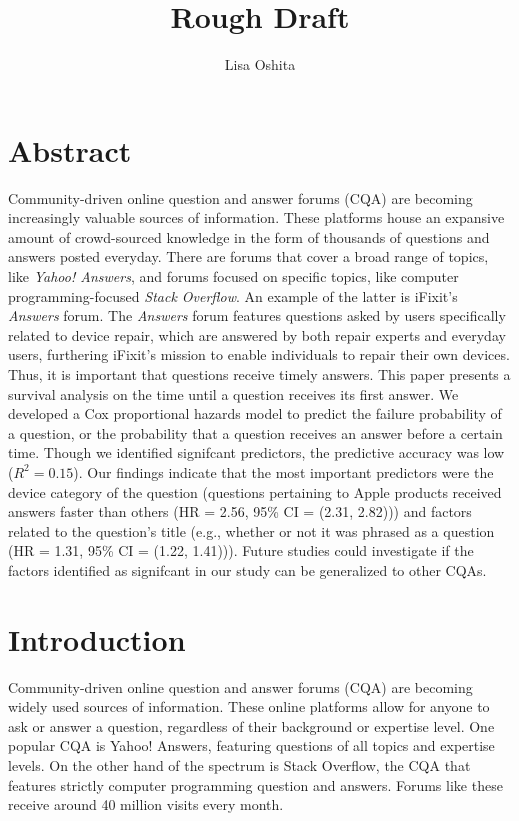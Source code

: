 \documentclass[12pt]{article}
\title{Rough Draft}
\author{Lisa Oshita}
\date{}
\begin{document}
\maketitle

\section{Abstract}

Community-driven online question and answer forums (CQA) are becoming increasingly valuable sources of information. These platforms house an expansive amount of crowd-sourced knowledge in the form of thousands of questions and answers posted everyday. There are forums that cover a broad range of topics, like \textit{Yahoo! Answers}, and forums focused on specific topics, like computer programming-focused \textit{Stack Overflow}. An example of the latter is iFixit's \textit{Answers} forum. The \textit{Answers} forum features questions asked by users specifically related to device repair, which are answered by both repair experts and everyday users, furthering iFixit's mission to enable individuals to repair their own devices. Thus, it is important that questions receive timely answers. This paper presents a survival analysis on the time until a question receives its first answer. We developed a Cox proportional hazards model to predict the failure probability of a question, or the probability that a question receives an answer before a certain time. Though we identified signifcant predictors, the predictive accuracy was low ($R^2 = 0.15$). Our findings indicate that the most important predictors were the device category of the question (questions pertaining to Apple products received answers faster than others (HR = 2.56, 95\% CI = (2.31, 2.82))) and factors related to the question's title (e.g., whether or not it was phrased as a question (HR = 1.31, 95\% CI = (1.22, 1.41))). Future studies could investigate if the factors identified as signifcant in our study can be generalized to other CQAs. 

\section{Introduction}

    Community-driven online question and answer forums (CQA) are becoming widely used sources of information. These online platforms allow for anyone to ask or answer a question, regardless of their background or expertise level. One popular CQA is Yahoo! Answers, featuring questions of all topics and expertise levels. On the other hand of the spectrum is Stack Overflow, the CQA that features strictly computer programming question and answers. Forums like these receive around 40 million visits every month.
    
\end{document}
